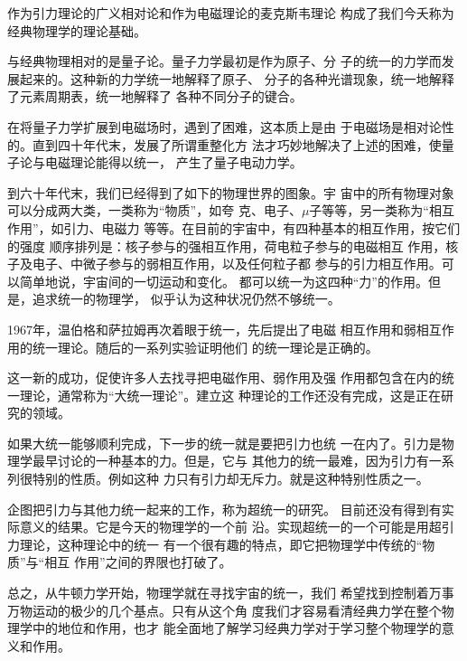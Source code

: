 作为引力理论的广义相对论和作为电磁理论的麦克斯韦理论
构成了我们今夭称为经典物理学的理论基础。

与经典物理相对的是量子论。量子力学最初是作为原子、分
子的统一的力学而发展起来的。这种新的力学统一地解释了原子、
分子的各种光谱现象，统一地解释了元素周期表，统一地解释了
各种不同分子的键合。

在将量子力学扩展到电磁场时，遇到了困难，这本质上是由
于电磁场是相对论性的。直到四十年代末，发展了所谓重整化方
法才巧妙地解决了上述的困难，使量子论与电磁理论能得以统一，
产生了量子电动力学。

到六十年代末，我们已经得到了如下的物理世界的图象。宇
宙中的所有物理对象可以分成两大类，一类称为“物质”，如夸
克、电子、$\mu$子等等，另一类称为“相互作用”，如引力、电磁力
等等。在目前的宇宙中，有四种基本的相互作用，按它们的强度
顺序排列是：核子参与的强相互作用，荷电粒子参与的电磁相互
作用，核子及电子、中微子参与的弱相互作用，以及任何粒子都
参与的引力相互作用。可以简单地说，宇宙间的一切运动和变化。
都可以统一为这四种“力”的作用。但是，追求统一的物理学，
似乎认为这种状况仍然不够统一。

1967年，温伯格和萨拉姆再次着眼于统一，先后提出了电磁
相互作用和弱相互作用的统一理论。随后的一系列实验证明他们
的统一理论是正确的。

这一新的成功，促使许多人去找寻把电磁作用、弱作用及强
作用都包含在内的统一理论，通常称为“大统一理论”。建立这
种理论的工作还没有完成，这是正在研究的领域。

如果大统一能够顺利完成，下一步的统一就是要把引力也统
一在内了。引力是物理学最早讨论的一种基本的力。但是，它与
其他力的统一最难，因为引力有一系列很特别的性质。例如这种
力只有引力却无斥力。就是这种特别性质之一。

企图把引力与其他力统一起来的工作，称为超统一的研究。
目前还没有得到有实际意义的结果。它是今天的物理学的一个前
沿。实现超统一的一个可能是用超引力理论，这种理论中的统一
有一个很有趣的特点，即它把物理学中传统的“物质”与“相互
作用”之间的界限也打破了。

总之，从牛顿力学开始，物理学就在寻找宇宙的统一，我们
希望找到控制着万事万物运动的极少的几个基点。只有从这个角
度我们才容易看清经典力学在整个物理学中的地位和作用，也才
能全面地了解学习经典力学对于学习整个物理学的意义和作用。
